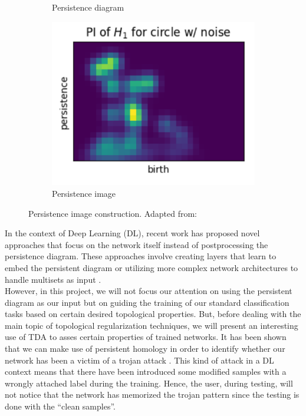 \documentclass[../main.tex]{subfiles}
\begin{document}
\begin{itemize}
\begin{figure}[!ht]
\begin{subfigure}[b]{0.33\textwidth}
        \caption{Persistence diagram}
         \label{fig:pers_img_2}
     \end{subfigure}\hfill
     \begin{subfigure}[b]{0.33\textwidth}
         \centering
         \includegraphics[width=\textwidth]{figures/bg/pers_img_3.png}
        \caption{Persistence image}
         \label{fig:pers_img_3}
     \end{subfigure}
        \caption{Persistence image construction. Adapted from: \cite{saul_persistence_2019}}
        \label{fig:persImages}
    \end{figure}
    
\end{itemize}

In the context of Deep Learning (DL), recent work has proposed novel approaches that focus on the network itself instead of postprocessing the persistence diagram. These approaches involve creating layers that learn to embed the persistent diagram or utilizing more complex network architectures to handle multisets as input \cite{hensel_survey_2021}.\\

However, in this project, we will not focus our attention on using the persistent diagram as our input but on guiding the training of our standard classification tasks based on certain desired topological properties. But, before dealing with the main topic of topological regularization techniques, we will present an interesting use of TDA to asses certain properties of trained networks. It has been shown that we can make use of persistent homology in order to identify whether our network has been a victim of a trojan attack \cite{zheng_topological_2022}. This kind of attack in a DL context means that there have been introduced some modified samples with a wrongly attached label during the training. Hence, the user, during testing, will not notice that the network has memorized the trojan pattern since the testing is done with the ``clean samples''.
\end{document}
